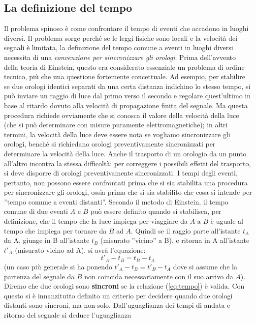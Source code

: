 \documentclass[a4paper,11pt]{book}
\theoremstyle{plain}
\theoremstyle{definition}
\begin{document}
\subsection{La definizione del tempo}
Il problema spinoso è come confrontare il tempo di eventi che accadono in luoghi diversi. 
Il problema sorge perché se le leggi fisiche sono locali e la velocità dei segnali è limitata, la 
definizione del tempo comune a eventi in luoghi diversi necessita di una \emph{convenzione per 
sincronizzare gli orologi}. Prima dell'avvento della teoria di Einstein, questo era considerato essenziale un problema di ordine tecnico, più che una questione fortemente concettuale. Ad esempio, per stabilire se due orologi identici separati da una 
certa distanza indichino lo stesso tempo, si può inviare un raggio di luce dal primo verso 
il secondo e regolare quest'ultimo in base al ritardo dovuto alla velocità di propagazione 
finita del segnale. Ma questa procedura richiede ovviamente che si conosca il valore della 
velocità della luce (che si può determinare con misure puramente elettromagnetiche); in altri termini, la velocità della luce deve essere nota se vogliamo 
sincronizzare gli orologi, benché si richiedano orologi preventivamente sincronizzati per 
determinare la velocità della luce. Anche il trasporto di un orologio da un punto all'altro 
incontra la stessa difficoltà: per correggere i possibili effetti del trasporto, si deve disporre 
di orologi preventivamente sincronizzati. I tempi degli eventi, pertanto, non possono 
essere confrontati prima che si sia stabilita una procedura per sincronizzare gli orologi, 
ossia prima che si sia stabilito che cosa si intende per ''tempo comune a eventi distanti''. 
Secondo il metodo di Einstein, il tempo comune di due eventi $A$ e $B$ può essere definito 
quando si stabilisca, per definizione, che il tempo che la luce impiega per viaggiare da 
$A$ a $B$ è uguale al tempo che impiega per tornare da $B$ ad $A$. Quindi se il raggio parte 
all'istante $t_A$ da A, giunge in B all'istante $t_B$ (misurato ''vicino'' a B), e ritorna in A 
all’istante $t'_A$ (misurato vicino ad A), si avrà l’equazione:
\begin{equation}\label{eq:tempo}
t'_A-t_B=t_B-t_A
\end{equation}
(un caso più generale si ha ponendo $t'_A-t_B=t'_B-t_A$ dove si assume che la partenza del segnale da 
$B$ non coincida necessariamente con il suo arrivo da $A$). Diremo che due orologi sono \textbf{sincroni} se la relazione (\ref{eq:tempo}) è valida. Con questo si è innanzitutto definito un criterio per decidere quando due orologi distanti sono sincroni, ma non solo. Dall'uguaglianza dei tempi di andata e ritorno del segnale si deduce l'uguaglianza 
\end{document}
